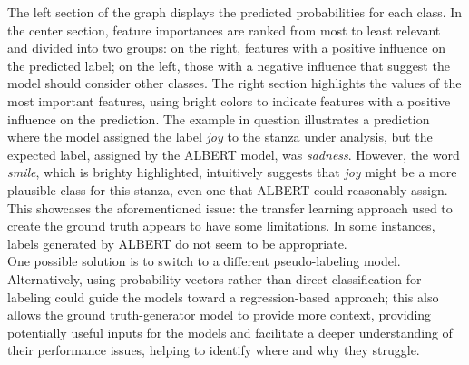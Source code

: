 The left section of the graph displays the
predicted probabilities for each class. In the center section,
feature importances are ranked from most to least relevant and divided into two
groups: on the right,
features with a positive influence on the predicted label; on the left, those
with a negative influence that suggest the model should consider other classes.
The right section highlights the values of the most important
features, using bright colors to indicate features with a positive influence on the
prediction.
The example in question illustrates a prediction where the model assigned the label \textit{joy} to the stanza under analysis, but the expected label, assigned by the ALBERT model, was \textit{sadness}.
However, the word \textit{smile}, which is brighty highlighted, intuitively suggests that \textit{joy} might be a more plausible class for this stanza, even one that ALBERT could reasonably assign. 
This showcases the aforementioned issue: the transfer learning approach used to
create the ground truth appears to have some limitations. In some instances, labels
generated by ALBERT do not seem to be appropriate.\\

One possible solution is to switch to a different pseudo-labeling model.
Alternatively, using probability vectors rather than direct classification for
labeling could guide the models toward a regression-based approach; this also
allows the ground truth-generator model to provide more context, providing potentially
useful inputs for the models and facilitate a deeper understanding of their
performance issues, helping to identify where and why they struggle.

